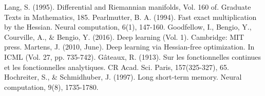 \documentclass{article}
\begin{document}
\begin{thebibliography}{9}
Lang, S. (1995). Differential and Riemannian manifolds, Vol. 160 of. Graduate Texts in Mathematics, 185.
Pearlmutter, B. A. (1994). Fast exact multiplication by the Hessian. Neural computation, 6(1), 147-160.
Goodfellow, I., Bengio, Y., Courville, A., \& Bengio, Y. (2016). Deep learning (Vol. 1). Cambridge: MIT press.
Martens, J. (2010, June). Deep learning via Hessian-free optimization. In ICML (Vol. 27, pp. 735-742).
G\^{a}teaux, R. (1913). Sur les fonctionnelles continues et les fonctionnelles analytiques. CR Acad. Sci. Paris, 157(325-327), 65.
Hochreiter, S., \& Schmidhuber, J. (1997). Long short-term memory. Neural computation, 9(8), 1735-1780.
\end{thebibliography}
\end{document}
